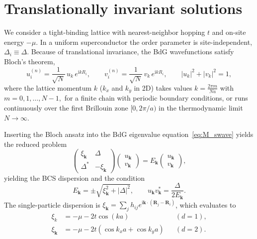 \documentclass[11pt,a4paper,twoside,openany]{report}
\begin{document}
\section{Translationally invariant solutions}

We consider a tight-binding lattice with nearest-neighbor hopping \(t\) and on-site energy \(-\mu\). In a uniform superconductor the order parameter is site-independent, \(\Delta_i \equiv \Delta\).  Because of translational invariance, the BdG wavefunctions satisfy Bloch's theorem,
\begin{equation}
  u_i^{(n)} = \frac{1}{\sqrt{N}}\,u_{k}\,e^{\mathrm{i} k R_i} ,\qquad
  v_i^{(n)} = \frac{1}{\sqrt{N}}\,v_{k}\,e^{\mathrm{i} k R_i} ,\qquad |u_{k}|^{2}+|v_{k}|^{2}=1,
\end{equation}
where the lattice momentum \(k\) ($k_x$ and $k_y$ in 2D) takes values \(
k = \frac{2\pi m}{N a}\) with \(m=0,1,\dots,N-1,\) for a finite chain with periodic boundary conditions, or runs continuously over the first Brillouin zone \([0,2\pi/a)\) in the thermodynamic limit \(N\to\infty\).

Inserting the Bloch ansatz into the BdG eigenvalue equation~\eqref{eq:M_swave} yields the reduced problem
\begin{equation}
  \begin{pmatrix}
    \xi_{\mathbf{k}} & \Delta \\[2pt]
    \Delta^{*} & -\xi_{\mathbf{k}}
  \end{pmatrix}
  \begin{pmatrix}
    u_{\mathbf{k}} \\[2pt] v_{\mathbf{k}}
  \end{pmatrix}
  = E_{\mathbf{k}}
  \begin{pmatrix}
    u_{\mathbf{k}} \\[2pt] v_{\mathbf{k}}
  \end{pmatrix},
\end{equation}
yielding the BCS dispersion and the condition
\begin{equation}
  E_{\mathbf{k}} = \pm\sqrt{\xi_{\mathbf{k}}^{2}+|\Delta|^{2}} ,\qquad
    u_{\mathbf{k}}  v_{\mathbf{k}}^*=\frac{\Delta}{2E_{\mathbf{k}}}.
\end{equation}
The single-particle dispersion is $\xi_{\mathbf{k}}=\sum_jh_{ij}e^{\mathrm{i}\mathbf{k}\cdot(\mathbf{R}_j-\mathbf{R}_i)}$, which evaluates to
\begin{align}
  \xi_{k} &= -\mu - 2t\cos(ka)  &&(d=1), \\
  \xi_{\mathbf{k}} &= -\mu - 2t(\cos k_x a + \cos k_y a) &&(d=2).
\end{align}
\end{document}
